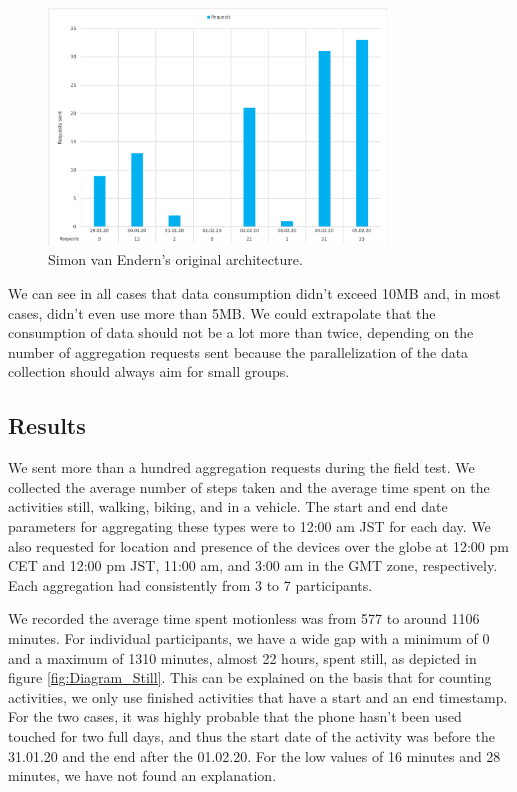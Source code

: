 \begin{figure}[htpb]
  \centering
  \includegraphics[width=0.8\textwidth]{figures/Diagram_Requests.png}
  \caption{Simon van Endern's original architecture.} \label{fig:diagram_requests}
\end{figure}

We can see in all cases that data consumption didn't exceed 10MB and, in most cases, didn't even use more than 5MB. We could extrapolate that the consumption of data should not be a lot more than twice, depending on the number of aggregation requests sent because the parallelization of the data collection should always aim for small groups.

\subsection{Results}
We sent more than a hundred aggregation requests during the field test. We collected the average number of steps taken and the average time spent on the activities still, walking, biking, and in a vehicle. The start and end date parameters for aggregating these types were to 12:00 am JST for each day. We also requested for location and presence of the devices over the globe at 12:00 pm CET and 12:00 pm JST, 11:00 am, and 3:00 am in the GMT zone, respectively. Each aggregation had consistently from 3 to 7 participants.


We recorded the average time spent motionless was from 577 to around 1106 minutes. For individual participants, we have a wide gap with a minimum of 0 and a maximum of 1310 minutes, almost 22 hours, spent still, as depicted in figure \ref{fig:Diagram_Still}. This can be explained on the basis that for counting activities, we only use finished activities that have a start and an end timestamp. For the two cases, it was highly probable that the phone hasn't been used touched for two full days, and thus the start date of the activity was before the 31.01.20 and the end after the 01.02.20. For the low values of 16 minutes and 28 minutes, we have not found an explanation. 

